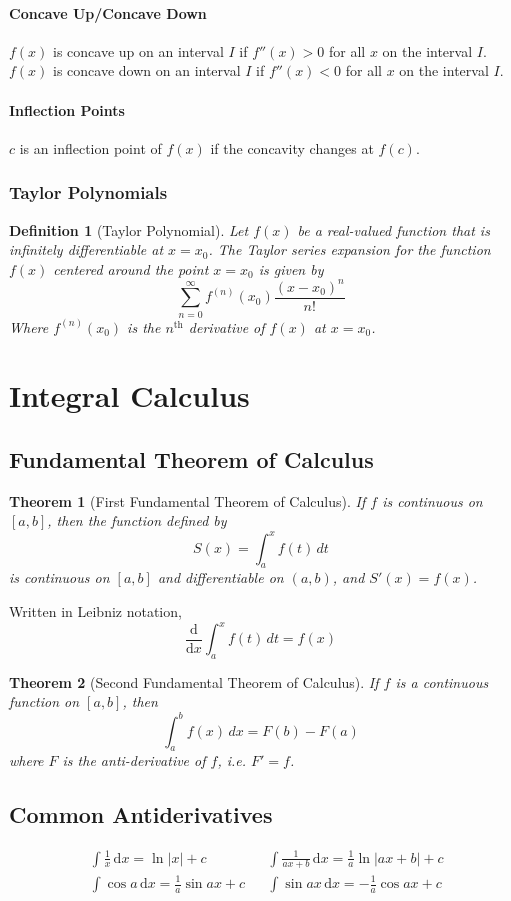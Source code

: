 \documentclass[12pt]{article}
\newcommand{\diff}[1]{\frac{\mathrm{d}}{\mathrm{d}#1}}
\newcommand{\der}[1]{\, \mathrm{d}#1}
\newtheorem{thrm}{Theorem}
\newtheorem{defn}{Definition}
\begin{document}
\paragraph{Concave Up/Concave Down}
\( f(x) \) is concave up on an interval \(I\) if \( f''(x) > 0 \) for all \(x\) on the interval \(I\).
\( f(x) \) is concave down on an interval \(I\) if \( f''(x) < 0 \) for all \(x\) on the interval \(I\).
\paragraph{Inflection Points}
\( c \) is an inflection point of \( f(x) \) if the concavity changes at \(f(c)\).

\subsubsection{Taylor Polynomials}
\begin{defn}[Taylor Polynomial]
\label{taylorpoly}
Let $f(x)$ be a real-valued function that is infinitely differentiable at $x = x_0$. The Taylor series expansion for the function $f(x)$ centered around the point $x = x_0$ is given by
$$\sum_{n=0}^{\infty}f^{(n)}(x_0)\frac{(x - x_0)^{n}}{n!}$$
Where $f^{(n)}(x_0)$ is the $n^\text{th}$ derivative of $f(x)$ at $x = x_0$.
\end{defn}



\section{Integral Calculus}
\subsection{Fundamental Theorem of Calculus}
\begin{thrm}[First Fundamental Theorem of Calculus]
	\label{ftc}
	If $f$ is continuous on $[a,b]$, then the function defined by
	$$S(x)=\int _{ a }^{ x }{ f(t)\, dt }$$
	is continuous on $[a,b]$ and differentiable on $(a,b)$, and $S'(x)=f(x)$.
\end{thrm}
Written in Leibniz notation,
$$\diff{x}\int_{a}^{x} f(t)\, dt = f(x)$$

\begin{thrm}[Second Fundamental Theorem of Calculus]
	If $f$ is a continuous function on $[a,b]$, then	
	$$\int _{ a }^{ b }{ f(x)\, dx=F(b)-F(a)}$$
	where $F$ is the anti-derivative of $f$, i.e. $F'=f$.
\end{thrm}
\subsection{Common Antiderivatives}
\begin{align*}
&\int\frac{1}{x}\der{x} = \ln|x| + c & &\int{\frac{1}{ax + b}\der{x}} = \frac{1}{a}\ln|ax+b| + c \\
&\int \cos a \der{x}= \frac1a \sin ax + c & &\int \sin ax\der{x}= - \frac1a \cos ax + c \\
&
\end{align*}
\end{document}
